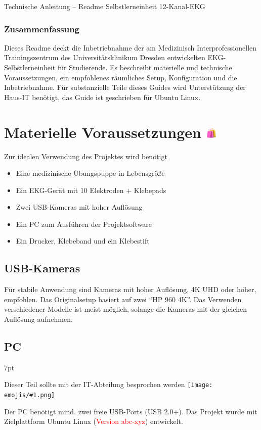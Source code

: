 \documentclass[a4paper, 10pt]{article}
\newcommand{\warn}[1]{\textcolor{red}{#1}}
\newcommand{\emoji}[1]{
    \begingroup\normalfont
    \texttt{[image: emojis/\#1.png]}
    \endgroup
}
\newenvironment{formal}{%
    \def\FrameCommand{%
    \hspace{1pt}%
    {\color{formalpipe}\vrule width 0.7mm}%
    {\color{formalshade}\vrule width 1.5mm}%
    \colorbox{formalshade}%
    }%
    \MakeFramed{\advance\hsize-\width\FrameRestore}%
    \noindent%
    \begin{adjustwidth}{}{7pt}%
    \vspace{2pt}\vspace{2pt}%
}
{%
    \vspace{2pt}\end{adjustwidth}\endMakeFramed%
}
\begin{document}
{ \Huge \noindent Technische Anleitung -- Readme} \newline
{ \LARGE \noindent Selbstlerneinheit 12-Kanal-EKG}

\subsubsection*{Zusammenfassung}
Dieses Readme deckt die Inbetriebnahme der am Medizinisch Interprofessionellen Trainingszentrum des Universitätsklinikum Dresden entwickelten EKG-Selbstlerneinheit für Studierende. Es beschreibt materielle und technische Voraussetzungen, ein empfohlenes räumliches Setup, Konfiguration und die Inbetriebnahme.
Für substanzielle Teile dieses Guides wird Unterstützung der Haus-IT benötigt, das Guide ist geschrieben für Ubuntu Linux.

\section{Materielle Voraussetzungen {\includegraphics[height=0.65em]{emojis/shopping-bags.png}}}
\label{sec:prerequisites}
Zur idealen Verwendung des Projektes wird benötigt
\begin{itemize}
    \item Eine medizinische Übungspuppe in Lebensgröße
    \item Ein EKG-Gerät mit 10 Elektroden + Klebepads
    \item Zwei USB-Kameras mit hoher Auflösung
    \item Ein PC zum Ausführen der Projektsoftware
    \item Ein Drucker, Klebeband und ein Klebestift
\end{itemize}

\subsection{USB-Kameras}
Für stabile Anwendung sind Kameras mit hoher Auflösung, 4K UHD oder höher, empfohlen. Das Originalsetup basiert auf zwei \enquote{HP 960 4K}. Das Verwenden verschiedener Modelle ist meist möglich, solange die Kameras mit der gleichen Auflösung aufnehmen.


\subsection{PC}
\begin{formal}
    Dieser Teil sollte mit der IT-Abteilung besprochen werden\emoji{technologist}
\end{formal}
Der PC benötigt mind. zwei freie USB-Ports (USB 2.0+). Das Projekt wurde mit Zielplattform Ubuntu Linux (\warn{Version abc-xyz}) entwickelt.
\end{document}
